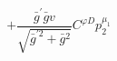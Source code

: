 %
\begin{dmath*}
%
  +  \frac{{\bar g}^\prime {\bar g}{} v}{\sqrt{{\bar g}^{\prime 2} + {\bar g}{}^2}}C^{ \varphi  D} p_2^{\mu_1}
%
\end{dmath*}
%

